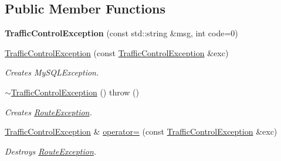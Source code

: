 \subsection*{Public Member Functions}
\begin{DoxyCompactItemize}
\item 
\mbox{\label{classecodtn_1_1net_1_1TrafficControlException_a96f9aa9c3641c6fac800485a652f20c3}} 
{\bfseries Traffic\+Control\+Exception} (const std\+::string \&msg, int code=0)
\item 
\mbox{\label{classecodtn_1_1net_1_1TrafficControlException_a109b248d691c1e5e24f0097ae41c0de6}} 
\hyperlink{classecodtn_1_1net_1_1TrafficControlException_a109b248d691c1e5e24f0097ae41c0de6}{Traffic\+Control\+Exception} (const \hyperlink{classecodtn_1_1net_1_1TrafficControlException}{Traffic\+Control\+Exception} \&exc)
\begin{DoxyCompactList}\small\item\em Creates My\+S\+Q\+L\+Exception. \end{DoxyCompactList}\item 
\mbox{\label{classecodtn_1_1net_1_1TrafficControlException_a276f24055e9dbdb357631aceabaceed3}} 
\hyperlink{classecodtn_1_1net_1_1TrafficControlException_a276f24055e9dbdb357631aceabaceed3}{$\sim$\+Traffic\+Control\+Exception} ()  throw ()
\begin{DoxyCompactList}\small\item\em Creates \hyperlink{classecodtn_1_1net_1_1RouteException}{Route\+Exception}. \end{DoxyCompactList}\item 
\mbox{\label{classecodtn_1_1net_1_1TrafficControlException_aa183eaf052a73ff46e4f0390d1869433}} 
\hyperlink{classecodtn_1_1net_1_1TrafficControlException}{Traffic\+Control\+Exception} \& \hyperlink{classecodtn_1_1net_1_1TrafficControlException_aa183eaf052a73ff46e4f0390d1869433}{operator=} (const \hyperlink{classecodtn_1_1net_1_1TrafficControlException}{Traffic\+Control\+Exception} \&exc)
\begin{DoxyCompactList}\small\item\em Destroys \hyperlink{classecodtn_1_1net_1_1RouteException}{Route\+Exception}. \end{DoxyCompactList}\item 

\end{DoxyCompactItemize}
